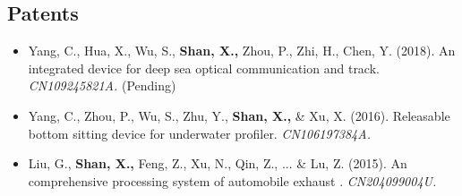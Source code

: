 \documentclass[11pt,a4paper,sans]{moderncv}         %
\begin{document}
\subsection{Patents} 

    \begin{itemize}

    \item{Yang, C., Hua, X., Wu, S., \textbf{Shan, X.,} Zhou, P., Zhi, H., Chen, Y. (2018). An integrated device for deep sea optical communication and track. \textit{CN109245821A.} (Pending)}

    \vspace{3pt}

    \item{Yang, C., Zhou, P., Wu, S., Zhu, Y., \textbf{Shan, X.,} \& Xu, X. (2016). Releasable bottom sitting device for underwater profiler. \textit{CN106197384A.}}

    \vspace{3pt}

    \item{Liu, G., \textbf{Shan, X.,} Feng, Z., Xu, N., Qin, Z., ... \& Lu, Z. (2015). An comprehensive processing system of automobile exhaust . \textit{CN204099004U.}}

    \vspace{3pt}

\end{itemize}


    

\end{document}
